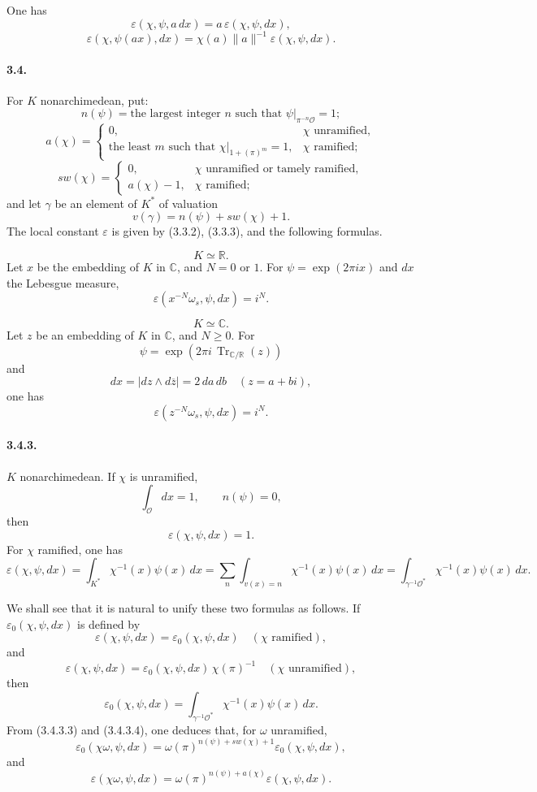 \documentclass[10pt]{article}
\newcommand{\C}{\mathbb C}
\newcommand{\Tr}{\operatorname{Tr}}
\providecommand{\R}{\mathbb R}
\providecommand{\Tr}{\operatorname{Tr}}
\providecommand{\Tr}{\operatorname{Tr}}
\providecommand{\Tr}{\operatorname{Tr}}
\begin{document}
One has
\[
\tag{3.3.2}
\varepsilon(\chi,\psi,a\,dx)=a\,\varepsilon(\chi,\psi,dx),
\]
\[
\tag{3.3.3}
\varepsilon(\chi,\psi(ax),dx)=\chi(a)\|a\|^{-1}\varepsilon(\chi,\psi,dx).
\]

\paragraph{3.4.} For \(K\) nonarchimedean, put:
\[
n(\psi)=\text{the largest integer }n\text{ such that }\psi|_{\pi^{-n}\mathcal O}=1;
\]
\[
a(\chi)=
\begin{cases}
0,&\chi\text{ unramified},\\
\text{the least }m\text{ such that }\chi|_{1+(\pi)^m}=1,&\chi\text{ ramified};
\end{cases}
\]
\[
sw(\chi)=
\begin{cases}
0,&\chi\text{ unramified or tamely ramified},\\
a(\chi)-1,&\chi\text{ ramified};
\end{cases}
\]
and let \(\gamma\) be an element of \(K^*\) of valuation
\[
v(\gamma)=n(\psi)+sw(\chi)+1.
\]
The local constant \(\varepsilon\) is given by (3.3.2), (3.3.3), and the following formulas.

\[
\tag{3.4.1}
K\simeq\R.
\]
Let \(x\) be the embedding of \(K\) in \(\C\), and \(N=0\) or \(1\). For \(\psi=\exp(2\pi ix)\) and \(dx\) the Lebesgue measure,
\[
\varepsilon(x^{-N}\omega_s,\psi,dx)=i^N.
\]

\[
\tag{3.4.2}
K\simeq\C.
\]
Let \(z\) be an embedding of \(K\) in \(\C\), and \(N\ge0\). For
\[
\psi=\exp(2\pi i\,\Tr_{\C/\R}(z))
\]
and
\[
dx=|dz\wedge d\overline z|=2\,da\,db\quad(z=a+bi),
\]
one has
\[
\varepsilon(z^{-N}\omega_s,\psi,dx)=i^N.
\]

\paragraph{3.4.3.} \(K\) nonarchimedean. If \(\chi\) is unramified,
\[
\int_{\mathcal O}dx=1,\qquad n(\psi)=0,
\]
then
\[
\tag{3.4.3.1}
\varepsilon(\chi,\psi,dx)=1.
\]
For \(\chi\) ramified, one has
\[
\tag{3.4.3.2}
\varepsilon(\chi,\psi,dx)=
\int_{K^*}\chi^{-1}(x)\psi(x)\,dx
=
\sum_n\int_{v(x)=n}\chi^{-1}(x)\psi(x)\,dx
=
\int_{\gamma^{-1}\mathcal O^*}\chi^{-1}(x)\psi(x)\,dx.
\]

We shall see that it is natural to unify these two formulas as follows. If \(\varepsilon_0(\chi,\psi,dx)\) is defined by
\[
\varepsilon(\chi,\psi,dx)=\varepsilon_0(\chi,\psi,dx)
\quad(\chi\text{ ramified}),
\]
and
\[
\tag{3.4.3.3}
\varepsilon(\chi,\psi,dx)=\varepsilon_0(\chi,\psi,dx)\,\chi(\pi)^{-1}
\quad(\chi\text{ unramified}),
\]
then
\[
\tag{3.4.3.4}
\varepsilon_0(\chi,\psi,dx)=
\int_{\gamma^{-1}\mathcal O^*}\chi^{-1}(x)\psi(x)\,dx.
\]
From (3.4.3.3) and (3.4.3.4), one deduces that, for \(\omega\) unramified,
\[
\tag{3.4.3.5}
\varepsilon_0(\chi\omega,\psi,dx)
=
\omega(\pi)^{n(\psi)+sw(\chi)+1}\varepsilon_0(\chi,\psi,dx),
\]
and
\[
\varepsilon(\chi\omega,\psi,dx)
=
\omega(\pi)^{n(\psi)+a(\chi)}\varepsilon(\chi,\psi,dx).
\]
\end{document}
